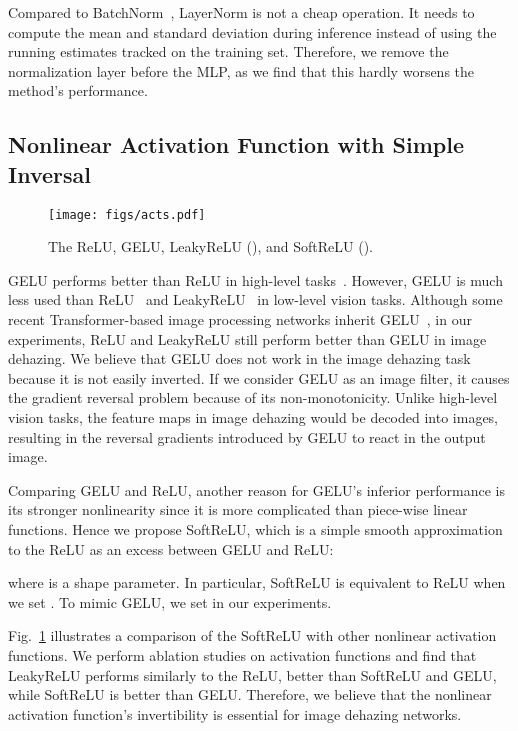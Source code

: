 \documentclass[journal]{IEEEtran}
\begin{document}
Compared to BatchNorm~\cite{ioffe2015batch}, LayerNorm is not a cheap operation. 
It needs to compute the mean and standard deviation during inference instead of using the running estimates tracked on the training set.
Therefore, we remove the normalization layer before the MLP, as we find that this hardly worsens the method's performance.

\subsection{Nonlinear Activation Function with Simple Inversal}

\begin{figure}[t]
    \centering
    \texttt{[image: figs/acts.pdf]}
    \caption{
        The ReLU, GELU, LeakyReLU (), and SoftReLU ().
    }
    \label{fig:acts}
\end{figure}

GELU performs better than ReLU in high-level tasks~\cite{ramachandran2017searching,tan2019efficientnet,liu2022convnet}.
However, GELU is much less used than ReLU~\cite{nair2010rectified} and LeakyReLU~\cite{maas2013rectifier} in low-level vision tasks.
Although some recent Transformer-based image processing networks inherit GELU~\cite{liang2021swinir,wang2022uformer}, in our experiments, ReLU and LeakyReLU still perform better than GELU in image dehazing.
We believe that GELU does not work in the image dehazing task because it is not easily inverted.
If we consider GELU as an image filter, it causes the gradient reversal problem because of its non-monotonicity.
Unlike high-level vision tasks, the feature maps in image dehazing would be decoded into images, resulting in the reversal gradients introduced by GELU to react in the output image.

Comparing GELU and ReLU, another reason for GELU's inferior performance is its stronger nonlinearity since it is more complicated than piece-wise linear functions.
Hence we propose SoftReLU, which is a simple smooth approximation to the ReLU as an excess between GELU and ReLU:

where  is a shape parameter.
In particular, SoftReLU is equivalent to ReLU when we set .
To mimic GELU, we set  in our experiments.

Fig.~\ref{fig:acts} illustrates a comparison of the SoftReLU with other nonlinear activation functions.
We perform ablation studies on activation functions and find that LeakyReLU performs similarly to the ReLU, better than SoftReLU and GELU, while SoftReLU is better than GELU.
Therefore, we believe that the nonlinear activation function's invertibility is essential for image dehazing networks.
\end{document}
